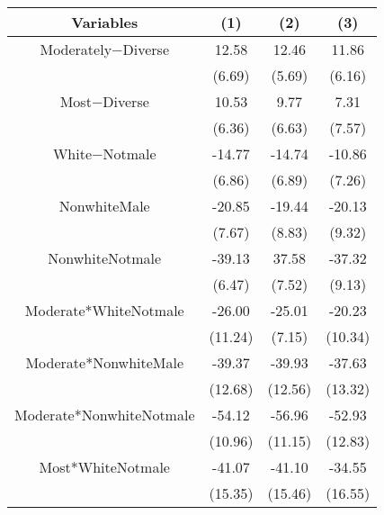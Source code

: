 \begin{table}[htbp]
    \begin{tabular}{c c c c}
    \toprule
    \textbf{Variables} & \textbf{(1)} & \textbf{(2)} & \textbf{(3)}       \\ 
\midrule
Moderately$-$Diverse        &     12.58\sym{**}    &    12.46\sym{**}     &  11.86\sym{**}  \\
                            &     (6.69)          &     (5.69)             &  (6.16) \\
Most$-$Diverse              &      10.53\sym{**}             &     9.77                & 7.31   \\
                            &      (6.36)         &     (6.63)           &  (7.57)  \\
White$-$Notmale          &      -14.77\sym{**}        &    -14.74\sym{**}    &  -10.86  \\
                            &      (6.86)         &    (6.89)             & (7.26)  \\
NonwhiteMale         &       -20.85\sym{**}   &  -19.44\sym{**}      &  -20.13\sym{**}\\
                            &      (7.67)         &    (8.83)             &  (9.32) \\
NonwhiteNotmale    &  -39.13\sym{***}          &  37.58\sym{***}               &  -37.32\sym{***} \\
                            &      (6.47)         &    (7.52)              &   (9.13) \\
Moderate*WhiteNotmale    &   -26.00 \sym{***} & -25.01\sym{**}       &  -20.23 \sym{***} \\
                                 &  (11.24)        &   (7.15)             &  (10.34)  \\
Moderate*NonwhiteMale      &   -39.37\sym{***} &  -39.93\sym{***}     &  -37.63\sym{***}  \\
                                 &  (12.68)        &     (12.56)             &  (13.32)   \\
Moderate*NonwhiteNotmale  &  -54.12\sym{***} &     -56.96\sym{***}     &  -52.93\sym{***} \\
                                 &  (10.96)        &     (11.15)             &  (12.83)   \\
Most*WhiteNotmale          &  -41.07\sym{***} &     -41.10\sym{***}     &  -34.55\sym{***}  \\
                                 &  (15.35)        &     (15.46)             &  (16.55)  \\

\end{tabular}
\end{table}
